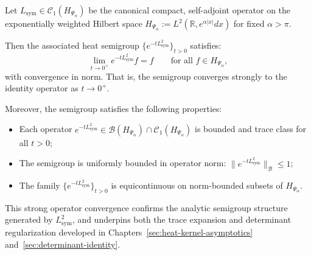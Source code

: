 \begin{proposition}
\label{prop:strong-op-closure-heat}
Let \( L_{\mathrm{sym}} \in \mathcal{C}_1(H_{\Psi_\alpha}) \) be the canonical compact, self-adjoint operator on the exponentially weighted Hilbert space \( H_{\Psi_\alpha} := L^2(\mathbb{R}, e^{\alpha |x|} dx) \) for fixed \( \alpha > \pi \).

Then the associated heat semigroup \( \{ e^{-t L_{\mathrm{sym}}^2} \}_{t > 0} \) satisfies:
\[
\lim_{t \to 0^+} e^{-t L_{\mathrm{sym}}^2} f = f \qquad \text{for all } f \in H_{\Psi_\alpha},
\]
with convergence in norm. That is, the semigroup converges strongly to the identity operator as \( t \to 0^+ \).

\medskip
\noindent
Moreover, the semigroup satisfies the following properties:
\begin{itemize}
    \item Each operator \( e^{-t L_{\mathrm{sym}}^2} \in \mathcal{B}(H_{\Psi_\alpha}) \cap \mathcal{C}_1(H_{\Psi_\alpha}) \) is bounded and trace class for all \( t > 0 \);
    \item The semigroup is uniformly bounded in operator norm: \( \| e^{-t L_{\mathrm{sym}}^2} \|_{\mathcal{B}} \le 1 \);
    \item The family \( \{ e^{-t L_{\mathrm{sym}}^2} \}_{t > 0} \) is equicontinuous on norm-bounded subsets of \( H_{\Psi_\alpha} \).
\end{itemize}

\medskip
\noindent
This strong operator convergence confirms the analytic semigroup structure generated by \( L_{\mathrm{sym}}^2 \), and underpins both the trace expansion and determinant regularization developed in Chapters~\ref{sec:heat-kernel-asymptotics} and~\ref{sec:determinant-identity}.
\end{proposition}

